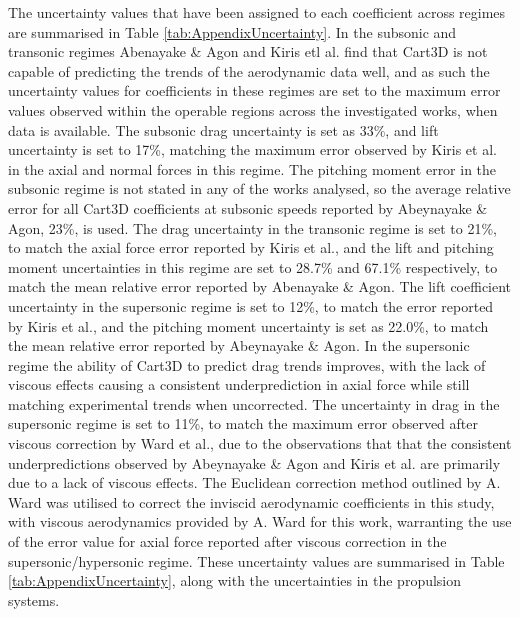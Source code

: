   The uncertainty values that have been assigned to each coefficient across regimes are summarised in Table \ref{tab:AppendixUncertainty}.
  In the subsonic and transonic regimes Abenayake \& Agon and Kiris etl al. find that Cart3D is not capable of predicting the trends of the aerodynamic data well\cite{Abeynayake2013a,Kiris2011}, and as such the uncertainty values for coefficients in these regimes are set to the maximum error values observed within the operable regions across the investigated works, when data is available.
  The subsonic drag uncertainty is set as 33\%, and lift uncertainty is set to 17\%, matching the  maximum error observed by Kiris et al.\cite{Kiris2011} in the axial and normal forces in this regime. 
The pitching moment error in the subsonic regime is not stated in any of the works analysed, so the average relative error for all Cart3D coefficients at subsonic speeds reported by Abeynayake \& Agon\cite{Abeynayake2013a}, 23\%, is used.
The drag uncertainty in the transonic regime is set to 21\%, to match the axial force error reported by Kiris et al.\cite{Kiris2011}, and the lift and pitching moment uncertainties in this regime are set to 28.7\% and 67.1\% respectively, to match the mean relative error reported by Abenayake \& Agon\cite{Abeynayake2013a}. 
The lift coefficient uncertainty in the supersonic regime is set to 12\%, to match the error reported by Kiris et al.\cite{Kiris2011}, and the pitching moment uncertainty is set as 22.0\%, to match the mean relative error reported by Abeynayake \& Agon\cite{Abeynayake2013a}. 
In the supersonic regime the ability of Cart3D to predict drag trends improves, with the lack of viscous effects causing a consistent underprediction in axial force while still matching experimental trends when uncorrected\cite{Abeynayake2013a,Ward2018,Kiris2011}. The uncertainty in drag in the supersonic regime is set to 11\%, to match the maximum error observed after viscous correction by Ward et al.\cite{Ward2018}, due to the observations that that the consistent underpredictions observed by Abeynayake \& Agon\cite{Abeynayake2013a} and Kiris et al.\cite{Kiris2011} are primarily due to a lack of viscous effects. The Euclidean correction method outlined by A. Ward was utilised to correct the inviscid aerodynamic coefficients in this study, with viscous aerodynamics provided by A. Ward for this work, warranting the use of the error value for axial force reported after viscous correction in the supersonic/hypersonic regime. 
These uncertainty values are summarised in Table \ref{tab:AppendixUncertainty}, along with the uncertainties in the propulsion systems. 




